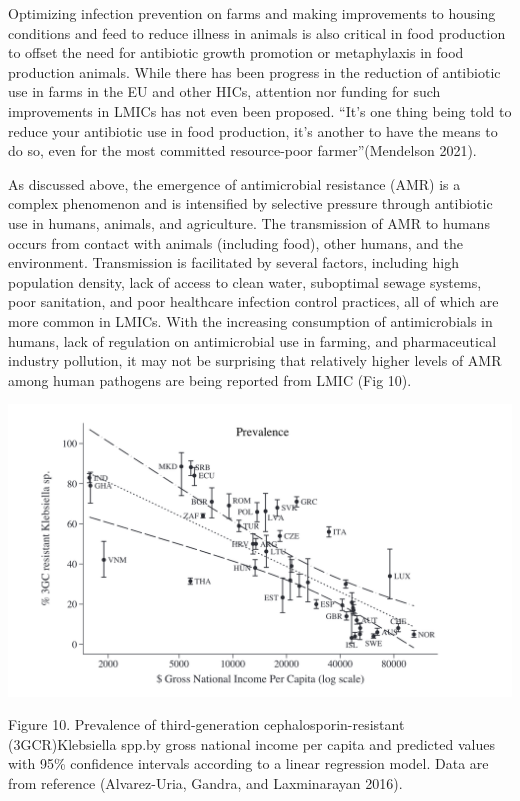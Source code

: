 \documentclass[]{tufte-handout}
\begin{document}
Optimizing infection prevention on farms and making improvements to
housing conditions and feed to reduce illness in animals is also
critical in food production to offset the need for antibiotic growth
promotion or metaphylaxis in food production animals. While there has
been progress in the reduction of antibiotic use in farms in the EU and
other HICs, attention nor funding for such improvements in LMICs has not
even been proposed. ``It's one thing being told to reduce your
antibiotic use in food production, it's another to have the means to do
so, even for the most committed resource-poor farmer''(Mendelson 2021).

As discussed above, the emergence of antimicrobial resistance (AMR) is a
complex phenomenon and is intensified by selective pressure through
antibiotic use in humans, animals, and agriculture. The transmission of
AMR to humans occurs from contact with animals (including food), other
humans, and the environment. Transmission is facilitated by several
factors, including high population density, lack of access to clean
water, suboptimal sewage systems, poor sanitation, and poor healthcare
infection control practices, all of which are more common in LMICs. With
the increasing consumption of antimicrobials in humans, lack of
regulation on antimicrobial use in farming, and pharmaceutical industry
pollution, it may not be surprising that relatively higher levels of AMR
among human pathogens are being reported from LMIC (Fig 10).

\includegraphics[width=6.25in,height=\textheight]{images/gdp.png}

Figure 10. Prevalence of third-generation cephalosporin-resistant
(3GCR)Klebsiella spp.by gross national income per capita and predicted
values with 95\% confidence intervals according to a linear regression
model. Data are from reference (Alvarez-Uria, Gandra, and Laxminarayan
2016).
\end{document}
